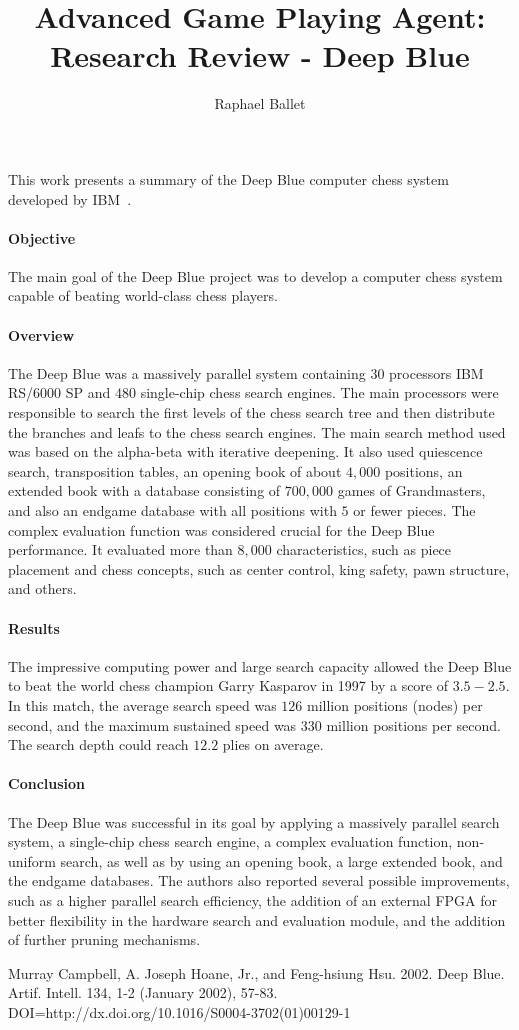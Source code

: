 \documentclass[12pt, a4paper]{article}
\title{Advanced Game Playing Agent: \\Research Review - Deep Blue}
\author{Raphael Ballet}
\date{}
\begin{document}
	\maketitle
This work presents a summary of the Deep Blue computer chess system developed by IBM~\cite{Campbell2002}.

\paragraph{Objective} The main goal of the Deep Blue project was to develop a computer chess system capable of beating world-class chess players. 

\paragraph{Overview} The Deep Blue was a massively parallel system containing $30$ processors IBM RS/6000 SP and $480$ single-chip chess search engines. The main processors were responsible to search the first levels of the chess search tree and then distribute the branches and leafs to the chess search engines. The main search method used was based on the alpha-beta with iterative deepening. It also used quiescence search, transposition tables, an opening book of about $4,000$ positions, an extended book with a database consisting of $700,000$ games of Grandmasters, and also an endgame database with all positions with $5$ or fewer pieces. The complex evaluation function was considered crucial for the Deep Blue performance. It evaluated more than $8,000$ characteristics, such as piece placement and chess concepts, such as center control, king safety, pawn structure, and others.

\paragraph{Results} The impressive computing power and large search capacity allowed the Deep Blue to beat the world chess champion Garry Kasparov in 1997 by a score of $3.5 - 2.5$. In this match, the average search speed was $126$ million positions (nodes) per second, and the maximum sustained speed was $330$ million positions per second. The search depth could reach $12.2$ plies on average.

\paragraph{Conclusion} The Deep Blue was successful in its goal by applying a massively parallel search system, a single-chip chess search engine, a complex evaluation function, non-uniform search, as well as by using an opening book, a large extended book, and the endgame databases. The authors also reported several possible improvements, such as a higher parallel search efficiency, the addition of an external FPGA for better flexibility in the hardware search and evaluation module, and the addition of further pruning mechanisms.
	
	
\begin{thebibliography}{9}	
		Murray Campbell, A. Joseph Hoane, Jr., and Feng-hsiung Hsu. 2002. Deep Blue. Artif. Intell. 134, 1-2 (January 2002), 57-83. DOI=http://dx.doi.org/10.1016/S0004-3702(01)00129-1
\end{thebibliography}
\end{document}

